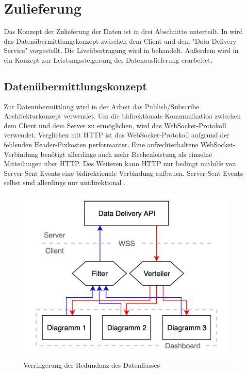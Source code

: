 \section{Zulieferung}
\label{sec:zulieferung}
Das Konzept der Zulieferung der Daten ist in drei Abschnitte
unterteilt. In  wird das Datenübermittlungskonzept
zwischen dem Client und dem "Data Delivery Service" vorgestellt.
Die Liveübertragung wird in  behandelt. 
Außerdem wird in  ein Konzept zur Leistungssteigerung der Datenauslieferung
erarbeitet.

\subsection{Datenübermittlungskonzept}
\label{subsec:datenuebermittlungskonzept}
Zur Datenübermittlung wird in der Arbeit das Publish/Subscribe Architekturkonzept verwendet.
Um die bidirektionale Kommunikation zwischen dem Client und dem Server zu ermöglichen,
wird das WebSocket-Protokoll verwendet. Verglichen mit HTTP ist das WebSocket-Protokoll
aufgrund der fehlenden Header-Fixkosten performanter. Eine aufrechterhaltene WebSocket-Verbindung
benötigt allerdings auch mehr Rechenleistung als einzelne Mitteilungen über HTTP. Des Weiteren
kann HTTP nur bedingt mithilfe von Server-Sent Events eine bidirektionale Verbindung aufbauen.
Server-Sent Events selbst sind allerdings nur unidirektional \cite[2. Abschnitt]{WebSocketVSSSE}.

\begin{figure}
    \begin{center}
    \includegraphics[scale=0.2]{img/abbildungen/Verteilung}
    \end{center}
    \caption{Verringerung der Redundanz des Datenflusses}
    \label{figure:uebersichtderdatenauslieferung}
\end{figure}

